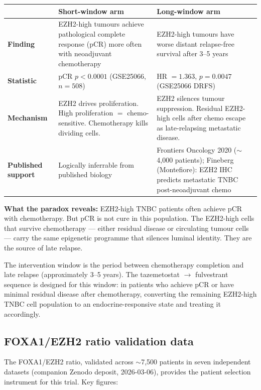 \documentclass[12pt, a4paper]{article}
\begin{document}
\begin{center}
\begin{tabular}{p{3.5cm}p{4.5cm}p{4.5cm}}
\toprule
& \textbf{Short-window arm} & \textbf{Long-window arm} \\
\midrule
\textbf{Finding}
& EZH2-high tumours achieve
  pathological complete response
  (pCR) more often with
  neoadjuvant chemotherapy
& EZH2-high tumours have worse
  distant relapse-free survival
  after 3--5 years \\[0.3em]
\textbf{Statistic}
& pCR $p < 0.0001$
  (GSE25066, $n=508$)
& HR $= 1.363$, $p = 0.0047$
  (GSE25066 DRFS) \\[0.3em]
\textbf{Mechanism}
& EZH2 drives proliferation.
  High proliferation $=$
  chemo-sensitive.
  Chemotherapy kills dividing cells.
& EZH2 silences tumour suppression.
  Residual EZH2-high cells after
  chemo escape as late-relapsing
  metastatic disease. \\[0.3em]
\textbf{Published support}
& Logically inferrable from
  published biology
& Frontiers Oncology 2020
  ($\sim$4,000 patients);
  Fineberg (Montefiore):
  EZH2 IHC predicts metastatic
  TNBC post-neoadjuvant chemo \\
\bottomrule
\end{tabular}
\end{center}

\noindent\textbf{What the paradox reveals:}
EZH2-high TNBC patients often achieve pCR with
chemotherapy. But pCR is not cure in this population.
The EZH2-high cells that survive chemotherapy ---
either residual disease or circulating tumour cells
--- carry the same epigenetic programme that silences
luminal identity. They are the source of late relapse.

The intervention window is the period between
chemotherapy completion and late relapse
(approximately 3--5 years). The tazemetostat
$\rightarrow$ fulvestrant sequence is designed for
this window: in patients who achieve pCR or have
minimal residual disease after chemotherapy, converting
the remaining EZH2-high TNBC cell population to an
endocrine-responsive state and treating it accordingly.

\subsection{FOXA1/EZH2 ratio validation data}

The FOXA1/EZH2 ratio, validated across $\sim$7,500
patients in seven independent datasets (companion
Zenodo deposit, 2026-03-06), provides the patient
selection instrument for this trial. Key figures:
\end{document}
